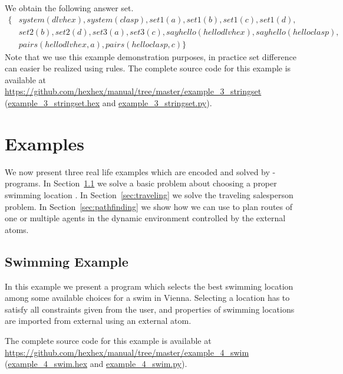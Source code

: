 \documentclass[a4paper, titlepage]{article}
\newcommand{\mi}[1]{\mathit{#1}}
\newcommand{\examplelink}[1]{\url{https://github.com/hexhex/manual/tree/master/#1}}
\newcommand{\exampledownloadlink}[2]{\href{https://github.com/hexhex/manual/raw/master/#1}{#2}}
\begin{document}
\begin{exmp}
\noindent
We obtain the following answer set.
\begin{align*}
  \{ & \mi{system(dlvhex),system(clasp),set1(a),set1(b),set1(c),set1(d),} \\
  & \mi{set2(b),set2(d),set3(a),set3(c),sayhello(hellodlvhex),sayhello(helloclasp),} \\
  & \mi{pairs(hellodlvhex,a),pairs(helloclasp,c)} \}
\end{align*}
%
Note that we use this example demonstration purposes,
in practice set difference can easier be realized using rules.
%
The complete source code for this example is available at
\examplelink{example_3_stringset}
(\exampledownloadlink{example_3_stringset/example_3_stringset.hex}{example\_3\_stringset.hex} and
\exampledownloadlink{example_3_stringset/example_3_stringset.py}{example\_3\_stringset.py}).
\end{exmp}

\section{Examples}
\label{sec:examples}
We now present three real life examples  
which are encoded and solved by \hex-programs.
In Section~\ref{sec:swimming} we solve a basic problem
about choosing a proper swimming location \cite{efikrs2015}.
In Section~\ref{sec:traveling} we solve the traveling salesperson problem.
In Section~\ref{sec:pathfinding} we show how we can use \dlvhex{}
to plan routes of one or multiple agents in the dynamic 
environment controlled by the external atoms.

\subsection{Swimming Example}
\label{sec:swimming}
In this example we present a program which selects  
the best swimming location among some available choices 
for a swim in Vienna. Selecting a location has to 
satisfy all constraints given from the user,
and properties of swimming locations are imported from external
using an external atom.

The complete source code for this example is available at
\examplelink{example_4_swim}
(\exampledownloadlink{example_4_swim/example_4_swim.hex}{example\_4\_swim.hex}
and 
\exampledownloadlink{example_4_swim/example_4_swim.py}{example\_4\_swim.py}).
\end{document}
